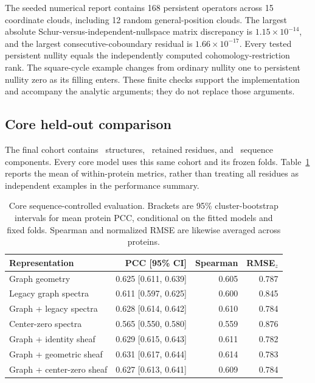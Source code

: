 The seeded numerical report contains 168 persistent operators across 15 coordinate clouds, including 12 random general-position clouds. The largest absolute Schur-versus-independent-nullspace matrix discrepancy is $1.15\times10^{-14}$, and the largest consecutive-coboundary residual is $1.66\times10^{-17}$. Every tested persistent nullity equals the independently computed cohomology-restriction rank. The square-cycle example changes from ordinary nullity one to persistent nullity zero as its filling enters. These finite checks support the implementation and accompany the analytic arguments; they do not replace those arguments.

\subsection{Core held-out comparison}
The final cohort contains \StudyProteins\ structures, \StudyResidues\ retained residues, and \StudyClusters\ sequence components. Every core model uses this same cohort and its frozen folds. Table~\ref{tab:core} reports the mean of within-protein metrics, rather than treating all residues as independent examples in the performance summary.


\begin{table}[htbp]\centering\small
\caption{Core sequence-controlled evaluation. Brackets are 95\% cluster-bootstrap intervals for mean protein PCC, conditional on the fitted models and fixed folds. Spearman and normalized RMSE are likewise averaged across proteins.}
\label{tab:core}
\begin{tabular}{lrrr}\toprule
Representation & PCC [95\% CI] & Spearman & RMSE$_z$\\\midrule
Graph geometry & 0.625 [0.611, 0.639] & 0.605 & 0.787 \\
Legacy graph spectra & 0.611 [0.597, 0.625] & 0.600 & 0.845 \\
Graph + legacy spectra & 0.628 [0.614, 0.642] & 0.610 & 0.784 \\
Center-zero spectra & 0.565 [0.550, 0.580] & 0.559 & 0.876 \\
Graph + identity sheaf & 0.629 [0.615, 0.643] & 0.611 & 0.782 \\
Graph + geometric sheaf & 0.631 [0.617, 0.644] & 0.614 & 0.783 \\
Graph + center-zero sheaf & 0.627 [0.613, 0.641] & 0.609 & 0.784 \\
\bottomrule\end{tabular}\end{table}


